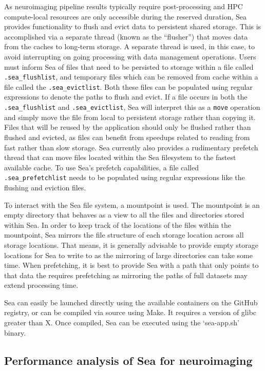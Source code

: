 \documentclass[10pt,journal,compsoc]{IEEEtran}
\begin{document}
As neuroimaging pipeline results typically require post-processing and HPC compute-local resources are only accessible during the
reserved duration, Sea provides functionality to flush and evict data to persistent shared storage. This is accomplished via a separate
thread (known as the ``flusher'') that moves data from the caches to long-term storage. A separate thread is used, in this case, to avoid
interrupting on going processing with data management operations.
Users must inform Sea of files that need to be
persisted to storage within a file called \texttt{.sea\_flushlist}, and temporary files which can be removed from cache within a file
called the \texttt{.sea\_evictlist}. Both these files can be populated using regular expressions to denote the paths to flush and evict.
If a file occurs in both the \texttt{.sea\_flushlist} and \texttt{.sea\_evictlist}, Sea will interpret this as a \texttt{move} operation
and simply move the file from local to persistent storage rather than copying it. Files that will be reused by the application should only
be flushed rather than flushed and evicted, as files can benefit from speedups related to reading from fast rather than slow storage.
Sea currently also provides a rudimentary prefetch thread that can move files located within the Sea filesystem to the fastest available cache.
To use Sea's prefetch capabilities, a file called \texttt{.sea\_prefetchlist} needs to be populated using regular expressions like the
flushing and eviction files.

To interact with the Sea file system, a mountpoint is used. The mountpoint is an empty directory that behaves as a view to
all the files and directories stored within Sea. In order to keep track of the locations of the files within the mountpoint, Sea
mirrors the file structure of each storage location across all storage locations. That means, it is generally advisable to provide
empty storage locations for Sea to write to as the mirroring of large directories can take some time. When prefetching, it is
best to provide Sea with a path that only points to that data the requires prefetching as mirroring the paths of full datasets may 
extend processing time.

Sea can easily be launched directly using the available containers on the GitHub registry, or can be compiled via source using Make.
It requires a version of glibc greater than X. Once compiled, Sea can be executed using the `sea-app.sh' binary.

\subsection{Performance analysis of Sea for neuroimaging}
\end{document}
